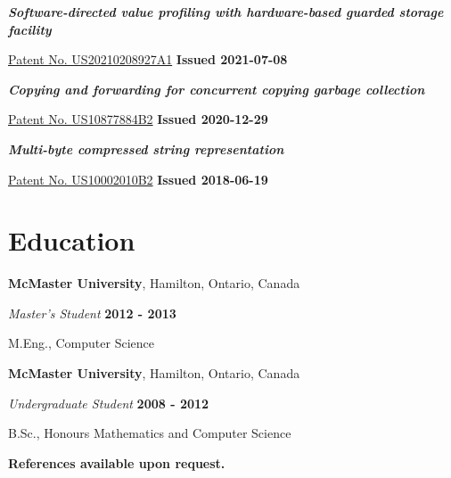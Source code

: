 \documentclass[margin,line]{res}
\begin{document}
\begin{resume}
\begin{list}{}{\leftmargin=0cm}
\item {\em \bf Software-directed value profiling with hardware-based guarded storage facility}

\href{https://patents.google.com/patent/US20210208927A1}{Patent No. US20210208927A1} \hfill {\bf Issued 2021-07-08}

\item {\em \bf Copying and forwarding for concurrent copying garbage collection}

\href{https://patents.google.com/patent/US10877884B2}{Patent No. US10877884B2} \hfill {\bf Issued 2020-12-29}

\item {\em \bf Multi-byte compressed string representation}

\href{https://patents.google.com/patent/US10002010B2}{Patent No. US10002010B2} \hfill {\bf Issued 2018-06-19}

\end{list}

\section{\sc Education}

{\bf McMaster University}, Hamilton, Ontario, Canada

\vspace{-.3cm}

{\em Master's Student} \hfill {\bf 2012 - 2013}

\vspace{-.4cm}

M.Eng., Computer Science

{\bf McMaster University}, Hamilton, Ontario, Canada

\vspace{-.3cm}

{\em Undergraduate Student} \hfill {\bf 2008 - 2012}

\vspace{-.4cm}

B.Sc., Honours Mathematics and Computer Science

\begin{center}
\textbf{References available upon request.}
\end{center}

\end{resume}
\end{document}
